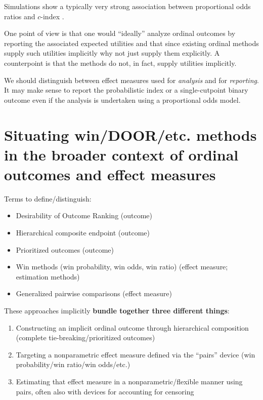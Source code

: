 \documentclass[
  11pt,
  fleqn
]{article}
\begin{document}
Simulations show a typically very strong association between
proportional odds ratios and $c$-index
\citep{harrellViolationProportionalOdds2020}.

One point of view is that one would ``ideally'' analyze ordinal
outcomes by reporting the associated expected utilities  and that since
existing ordinal methods supply such utilities implicitly why not
just supply them explicitly. A counterpoint is that the methods do
not, in fact,
supply utilities implicitly.

We should distinguish between effect measures used for \emph{analysis} and for
\emph{reporting}. It may make sense to report the probabilistic index or a
single-cutpoint binary outcome even if the analysis is undertaken using a
proportional odds model.

\section{Situating win/DOOR/etc. methods in the broader context of ordinal
outcomes and effect measures}

Terms to define/distinguish:
\begin{itemize}
  \item Desirability of Outcome Ranking (outcome)
  \item Hierarchical composite endpoint (outcome)
  \item Prioritized outcomes (outcome)
  \item Win methods (win probability, win odds, win ratio) (effect
    measure; estimation methods)
  \item Generalized pairwise comparisons (effect measure)
\end{itemize}

These approaches implicitly \textbf{bundle together three different things}:
\begin{enumerate}
  \item Constructing an implicit ordinal outcome through
    hierarchical composition (complete tie-breaking/prioritized outcomes)
  \item Targeting a nonparametric effect measure defined via the
    ``pairs'' device (win probability/win ratio/win odds/etc.)
  \item Estimating that effect measure in a nonparametric/flexible
    manner using pairs, often also with devices for accounting for censoring
\end{enumerate}
\end{document}
